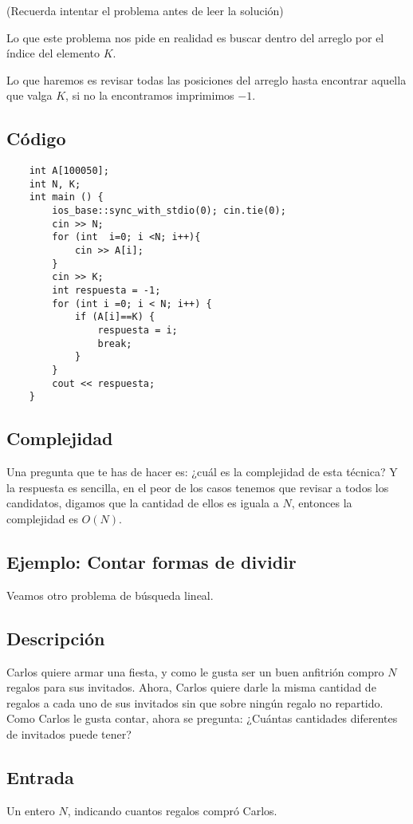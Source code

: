 (Recuerda intentar el problema antes de leer la solución)

Lo que este problema nos pide en realidad es buscar dentro del arreglo por el índice del elemento \(K\).

Lo que haremos es revisar todas las posiciones del arreglo hasta encontrar aquella que valga \(K\), si no la encontramos imprimimos \(-1\).


\subsection*{Código}
\begin{lstlisting}
	int A[100050];
	int N, K;
	int main () {	
		ios_base::sync_with_stdio(0); cin.tie(0);
		cin >> N;
		for (int  i=0; i <N; i++){ 
			cin >> A[i];
		}
		cin >> K;
		int respuesta = -1;
		for (int i =0; i < N; i++) {
			if (A[i]==K) {
				respuesta = i;
				break;
			}
		}
		cout << respuesta;
	}
\end{lstlisting}


\subsection{Complejidad}

Una pregunta que te has de hacer es: ¿cuál es la complejidad de esta técnica? Y la respuesta es sencilla, en el peor de los casos tenemos que revisar a todos los candidatos, digamos que la cantidad de ellos es iguala a \(N\), entonces la complejidad es \(O(N)\).

\subsection*{Ejemplo: Contar formas de dividir}
Veamos otro problema de búsqueda lineal. 

\subsection*{Descripción}

Carlos quiere armar una fiesta, y como le gusta ser un buen anfitrión compro \(N\) regalos para sus invitados.
Ahora, Carlos quiere darle la misma cantidad de regalos a cada uno de sus invitados sin que sobre ningún regalo no repartido. Como Carlos le gusta contar, ahora se pregunta: ¿Cuántas cantidades diferentes de invitados puede tener?
\subsection*{Entrada}
Un entero \(N\), indicando cuantos regalos compró Carlos.

